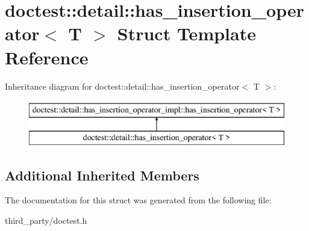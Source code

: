 \hypertarget{structdoctest_1_1detail_1_1has__insertion__operator}{}\section{doctest\+::detail\+::has\+\_\+insertion\+\_\+operator$<$ T $>$ Struct Template Reference}
\label{structdoctest_1_1detail_1_1has__insertion__operator}
Inheritance diagram for doctest\+::detail\+::has\+\_\+insertion\+\_\+operator$<$ T $>$\+:\begin{figure}[H]
\begin{center}
\leavevmode
\includegraphics[height=2.000000cm]{structdoctest_1_1detail_1_1has__insertion__operator}
\end{center}
\end{figure}
\subsection*{Additional Inherited Members}


The documentation for this struct was generated from the following file\+:\begin{DoxyCompactItemize}
\item 
third\+\_\+party/doctest.\+h\end{DoxyCompactItemize}
